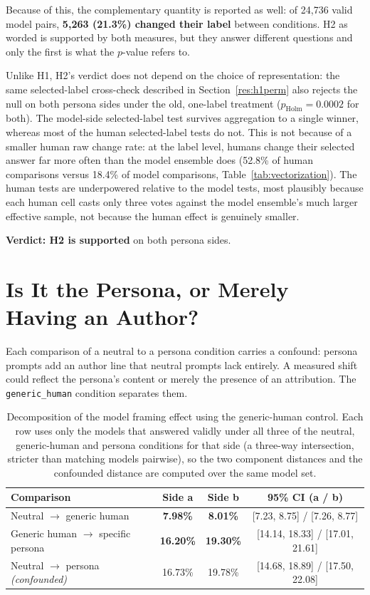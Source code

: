 Because of this, the complementary quantity is reported as well: of 24{,}736 valid model pairs,
\textbf{5{,}263 (21.3\%) changed their label} between conditions. H2 as worded is supported by
both measures, but they answer different questions and only the first is what the $p$-value refers
to.

\noindent
Unlike H1, H2's verdict does not depend on the choice of representation: the same selected-label
cross-check described in Section~\ref{res:h1perm} also rejects the null on both persona sides
under the old, one-label treatment ($p_{\text{Holm}} = 0.0002$ for both). The model-side selected-label
test survives aggregation to a single winner, whereas most of the human selected-label tests do
not. This is not because of a smaller human raw change rate: at the label level, humans change
their selected answer far more often than the model ensemble does (52.8\% of human comparisons
versus 18.4\% of model comparisons, Table~\ref{tab:vectorization}). The
human tests are underpowered relative to the model tests, most plausibly because each human cell
casts only three votes against the model ensemble's much larger effective sample, not because the
human effect is genuinely smaller.

\noindent
\textbf{Verdict: H2 is supported} on both persona sides.

\section{Is It the Persona, or Merely Having an Author?}
\label{res:generic}

\noindent
Each comparison of a neutral to a persona condition carries a confound: persona prompts add an
author line that neutral prompts lack entirely. A measured shift could reflect the persona's
content or merely the presence of an attribution. The \texttt{generic\_human} condition separates
them.

\begin{table}[h]
\centering
\footnotesize
\caption{Decomposition of the model framing effect using the generic-human control. Each row uses
only the models that answered validly under all three of the neutral, generic-human and persona
conditions for that side (a three-way intersection, stricter than matching models pairwise), so
the two component distances and the confounded distance are computed over the same model set.}
\label{tab:generic}
\begin{tabular}{lccc}
\hline
\textbf{Comparison} & \textbf{Side a} & \textbf{Side b} & \textbf{95\% CI (a / b)} \\
\hline
Neutral $\rightarrow$ generic human & \textbf{7.98\%} & \textbf{8.01\%} & [7.23, 8.75] / [7.26, 8.77] \\
Generic human $\rightarrow$ specific persona & \textbf{16.20\%} & \textbf{19.30\%} & [14.14, 18.33] / [17.01, 21.61] \\
Neutral $\rightarrow$ persona \emph{(confounded)} & 16.73\% & 19.78\% & [14.68, 18.89] / [17.50, 22.08] \\
\hline
\end{tabular}
\end{table}

